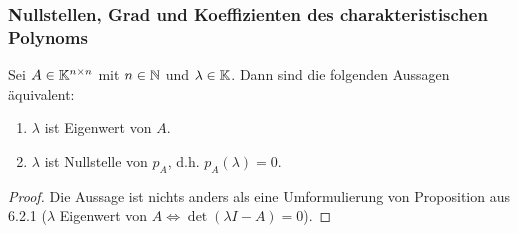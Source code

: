 \subsubsection{Nullstellen, Grad und Koeffizienten des charakteristischen Polynoms}

\begin{propn}
	Sei $ A \in \mathbb K^{n \times n} $ mit $ n \in \mathbb N $ und $ \lambda \in \mathbb K $. Dann sind die folgenden Aussagen äquivalent:
	\begin{enumerate}
		\item
			$ \lambda $ ist Eigenwert von $ A $.
		\item
			$ \lambda $ ist Nullstelle von $ p_A $, d.h. $ p_A(\lambda) = 0 $.
	\end{enumerate}
\end{propn}
\begin{proof}
	Die Aussage ist nichts anders als eine Umformulierung von Proposition aus 6.2.1 ($ \lambda $ Eigenwert von $ A \Leftrightarrow \det(\lambda I - A) = 0 $).
\end{proof}


